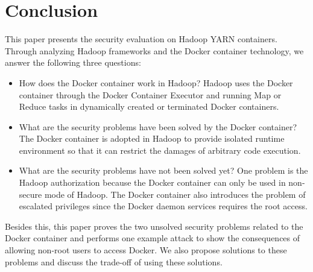 \section{Conclusion}
\label{sec:conc}

\iffalse
Conclusions (don't summarize your work here. That's what the abstract
was for. Instead provide some philosophical ruminations of your work and
future possibilities, i.e., conclusions that you have arrived at as a
result of your work.)
\fi
This paper presents the security evaluation on Hadoop YARN containers. Through analyzing Hadoop frameworks and the Docker container technology, we answer the following three questions:
\begin{itemize}
\item {How does the Docker container work in Hadoop? Hadoop uses the Docker container through the Docker Container Executor and running Map or Reduce tasks in dynamically created or terminated Docker containers.}
\item {What are the security problems have been solved by the Docker container? The Docker container is adopted in Hadoop to provide isolated runtime environment so that it can restrict the damages of arbitrary code execution.}
\item {What are the security problems have not been solved yet? One problem is the Hadoop authorization because the Docker container can only be used in non-secure mode of Hadoop. The Docker container also introduces the problem of escalated privileges since the Docker daemon services requires the root access.}
\end{itemize}

Besides this, this paper proves the two unsolved security problems related to the Docker container and performs one example attack to show the consequences of allowing non-root users to access Docker. We also propose solutions to these problems and discuss the trade-off of using these solutions.

